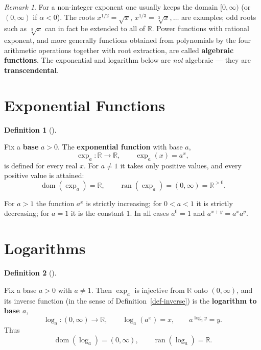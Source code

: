 \documentclass[
  letterpaper,
  DIV=11,
  numbers=noendperiod]{scrreprt}
\theoremstyle{plain}
\theoremstyle{plain}
\theoremstyle{definition}
\newtheorem{definition}{Definition}[chapter]
\theoremstyle{definition}
\theoremstyle{definition}
\theoremstyle{plain}
\theoremstyle{plain}
\theoremstyle{remark}
\newtheorem{refremark}{Remark}[chapter]
\begin{document}
\begin{refremark}
For a non-integer exponent one usually keeps the domain \([0,\infty)\)
(or \((0,\infty)\) if \(\alpha<0\)). The roots \(x^{1/2} = \sqrt{x}\),
\(x^{1/3} = \sqrt[3]{x},\dots\) are examples; odd roots such as
\(\sqrt[3]{x}\) can in fact be extended to all of \(\mathbb{R}\). Power
functions with rational exponent, and more generally functions obtained
from polynomials by the four arithmetic operations together with root
extraction, are called \textbf{algebraic functions}. The exponential and
logarithm below are \emph{not} algebraic --- they are
\textbf{transcendental}.

\label{rem-roots}

\end{refremark}

\section{Exponential Functions}\label{exponential-functions}

\begin{definition}[]\protect\hypertarget{def-exponential}{}\label{def-exponential}

\hfill\break
Fix a \textbf{base} \(a > 0\). The \textbf{exponential function} with
base \(a\), \[
\exp_a\colon \mathbb{R}\to \mathbb{R}, \qquad \exp_a(x) = a^{x},
\] is defined for every real \(x\). For \(a\neq 1\) it takes only
positive values, and every positive value is attained: \[
\operatorname{dom}(\exp_a) = \mathbb{R}, \qquad \operatorname{ran}(\exp_a) = (0,\infty) = \mathbb{R}^{>0}.
\]

\end{definition}

For \(a > 1\) the function \(a^x\) is strictly increasing; for
\(0 < a < 1\) it is strictly decreasing; for \(a=1\) it is the constant
\(1\). In all cases \(a^0 = 1\) and \(a^{x+y} = a^x a^y\).

\section{Logarithms}\label{logarithms}

\begin{definition}[]\protect\hypertarget{def-logarithm}{}\label{def-logarithm}

\hfill\break
Fix a base \(a > 0\) with \(a\neq 1\). Then \(\exp_a\) is injective from
\(\mathbb{R}\) onto \((0,\infty)\), and its inverse function (in the
sense of Definition~\ref{def-inverse}) is the \textbf{logarithm to base
\(a\)}, \[
\log_a\colon (0,\infty)\to\mathbb{R}, \qquad
\log_a(a^{x}) = x, \qquad a^{\log_a y} = y.
\] Thus \[
\operatorname{dom}(\log_a) = (0,\infty), \qquad \operatorname{ran}(\log_a) = \mathbb{R}.
\]

\end{definition}
\end{document}
